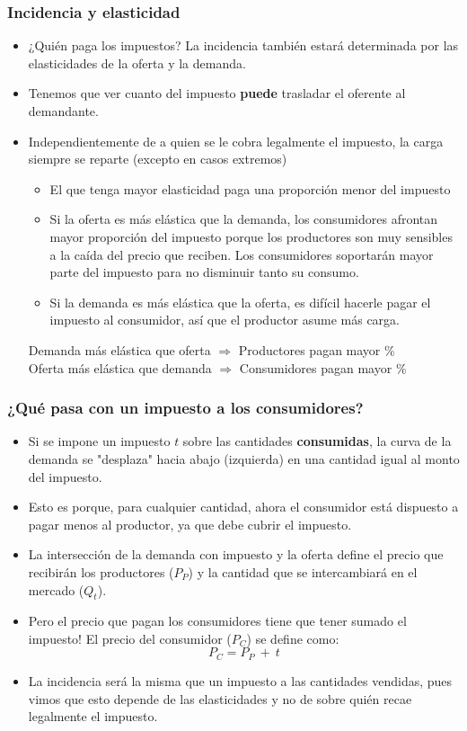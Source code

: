 \documentclass{beamer}
\begin{document}
\begin{frame}
\frametitle{Incidencia y elasticidad}
\begin{itemize}
    \item ¿Quién paga los impuestos? La incidencia también estará determinada por las elasticidades de la oferta y la demanda. 
    \item Tenemos que ver cuanto del impuesto \textbf{puede} trasladar el oferente al demandante.
    \item Independientemente de a quien se le cobra legalmente el impuesto, la carga siempre se reparte (excepto en casos extremos)
        \begin{itemize}
        \item El que tenga mayor elasticidad paga una proporción menor del impuesto
        \item Si la oferta es más elástica que la demanda, los consumidores afrontan mayor proporción del impuesto porque los productores son muy sensibles a la caída del precio que reciben. Los consumidores soportarán mayor parte del impuesto para no disminuir tanto su consumo. 
        \item Si la demanda es más elástica que la oferta, es difícil hacerle pagar el impuesto al consumidor, así que el productor asume más carga.
        \end{itemize}
    \begin{boxB}
    \small
    \centering
    Demanda más elástica que oferta  $\Longrightarrow$ Productores pagan mayor \% \\
    Oferta más elástica que demanda  $\Longrightarrow$ Consumidores pagan mayor \%
    \end{boxB}
\end{itemize}
\end{frame}



\begin{frame}
\frametitle{¿Qué pasa con un impuesto a los consumidores?}
\begin{itemize}
    \item Si se impone un impuesto $t$ sobre las cantidades \textbf{consumidas}, la curva de la demanda se "desplaza" hacia abajo (izquierda) en una cantidad igual al monto del impuesto.
    \item Esto es porque, para cualquier cantidad, ahora el consumidor está dispuesto a pagar menos al productor, ya que debe cubrir el impuesto.
    \item La intersección de la demanda con impuesto y la oferta define el precio que recibirán los productores ($P_P$) y la cantidad que se intercambiará en el mercado ($Q_t$).
    \item Pero el precio que pagan los consumidores tiene que tener sumado el impuesto! El precio del consumidor ($P_C$) se define como:
      \[ P_C=P_P\ + \ t\] 
      \vspace{-8mm}
     \item La incidencia será la misma que un impuesto a las cantidades vendidas, pues vimos que esto depende de las elasticidades y no de sobre quién recae legalmente el impuesto. 
\end{itemize}
\end{frame}
\end{document}
